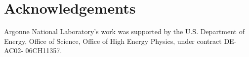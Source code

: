 \section*{Acknowledgements}

Argonne National Laboratory’s work was supported by the U.S. Department of Energy, Office of Science, Office of High Energy Physics, under contract DE-AC02- 06CH11357.
